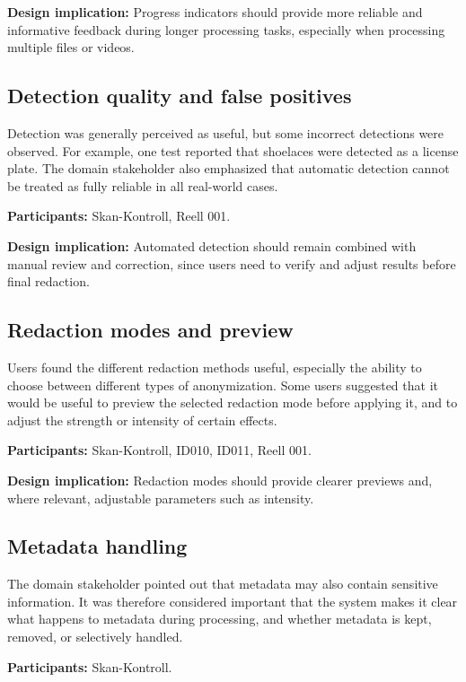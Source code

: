 \textbf{Design implication:} Progress indicators should provide more reliable
and informative feedback during longer processing tasks, especially when
processing multiple files or videos.

\subsection*{Detection quality and false positives}

Detection was generally perceived as useful, but some incorrect detections were
observed. For example, one test reported that shoelaces were detected as a
license plate. The domain stakeholder also emphasized that automatic detection
cannot be treated as fully reliable in all real-world cases.

\textbf{Participants:} Skan-Kontroll, Reell 001.

\textbf{Design implication:} Automated detection should remain combined with
manual review and correction, since users need to verify and adjust results
before final redaction.

\subsection*{Redaction modes and preview}

Users found the different redaction methods useful, especially the ability to
choose between different types of anonymization. Some users suggested that it
would be useful to preview the selected redaction mode before applying it, and
to adjust the strength or intensity of certain effects.

\textbf{Participants:} Skan-Kontroll, ID010, ID011, Reell 001.

\textbf{Design implication:} Redaction modes should provide clearer previews
and, where relevant, adjustable parameters such as intensity.

\subsection*{Metadata handling}

The domain stakeholder pointed out that metadata may also contain sensitive
information. It was therefore considered important that the system makes it
clear what happens to metadata during processing, and whether metadata is kept,
removed, or selectively handled.

\textbf{Participants:} Skan-Kontroll.

